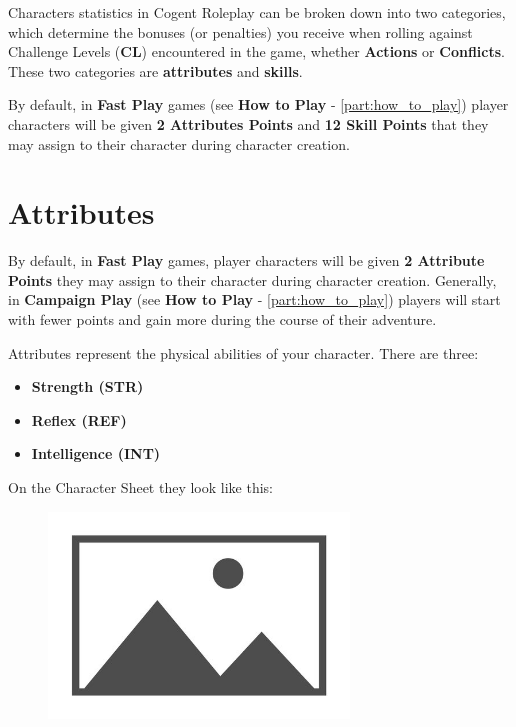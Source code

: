 Characters statistics in Cogent Roleplay can be broken down into two categories, which determine the bonuses (or penalties) you receive when rolling against Challenge Levels (\textbf{CL}) encountered in the game, whether \textbf{Actions} or \textbf{Conflicts}. These two categories are \textbf{attributes} and \textbf{skills}.

By default, in \textbf{Fast Play} games (see \textbf{How to Play} - \autoref{part:how_to_play}) player characters will be given \textbf{2 Attributes Points} and \textbf{12 Skill Points} that they may assign to their character during character creation.

\section{Attributes} \label{sec:attributes}

By default, in \textbf{Fast Play} games, player characters will be given \textbf{2 Attribute Points} they may assign to their character during character creation.  Generally, in \textbf{Campaign Play} (see \textbf{How to Play} - \autoref{part:how_to_play}) players will start with fewer points and gain more during the course of their adventure.

Attributes represent the physical abilities of your character.  There are three:

\begin{itemize}
    \item \textbf{Strength (STR)}
    \item \textbf{Reflex (REF)}
    \item \textbf{Intelligence (INT)}
\end{itemize}

On the Character Sheet they look like this:

\begin{figure}[H]
    \includegraphics[width=8cm]{images/placeholder}
    \centering
\end{figure}

